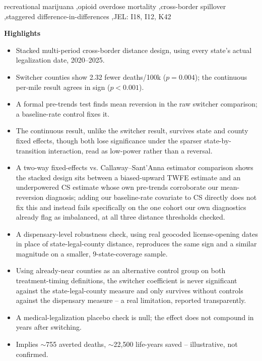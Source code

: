 \documentclass[preprint,12pt,authoryear]{elsarticle}
\begin{document}
\begin{frontmatter}
\begin{keyword}
recreational marijuana \sep opioid overdose mortality \sep cross-border spillover \sep staggered difference-in-differences \sep JEL: I18, I12, K42
\end{keyword}

\end{frontmatter}

\vspace{0.3cm}
\noindent\textbf{Highlights}
\begin{itemize}[leftmargin=1.4em]
\item Stacked multi-period cross-border distance design, using every state's actual legalization date, 2020--2025.
\item Switcher counties show 2.32 fewer deaths/100k ($p{=}0.004$); the continuous per-mile result agrees in sign ($p{<}0.001$).
\item A formal pre-trends test finds mean reversion in the raw switcher comparison; a baseline-rate control fixes it.
\item The continuous result, unlike the switcher result, survives state and county fixed effects, though both lose significance under the sparser state-by-transition interaction, read as low-power rather than a reversal.
\item A two-way fixed-effects vs. Callaway--Sant'Anna estimator comparison shows the stacked design sits between a biased-upward TWFE estimate and an underpowered CS estimate whose own pre-trends corroborate our mean-reversion diagnosis; adding our baseline-rate covariate to CS directly does not fix this and instead fails specifically on the one cohort our own diagnostics already flag as imbalanced, at all three distance thresholds checked.
\item A dispensary-level robustness check, using real geocoded license-opening dates in place of state-legal-county distance, reproduces the same sign and a similar magnitude on a smaller, 9-state-coverage sample.
\item Using already-near counties as an alternative control group on both treatment-timing definitions, the switcher coefficient is never significant against the state-legal-county measure and only survives without controls against the dispensary measure -- a real limitation, reported transparently.
\item A medical-legalization placebo check is null; the effect does not compound in years after switching.
\item Implies $\sim$755 averted deaths, $\sim$22,500 life-years saved -- illustrative, not confirmed.
\end{itemize}
\end{document}
